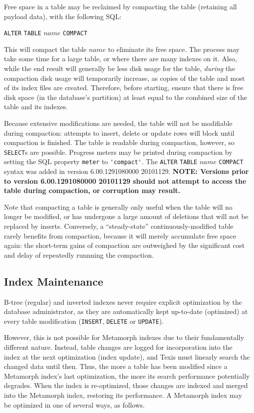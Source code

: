   Free space in a table may be reclaimed by compacting the table
(retaining all payload data), with the following SQL:

\verb`ALTER` \verb`TABLE` $name$ \verb`COMPACT`

This will compact the table $name$ to eliminate its free space.  The
process may take some time for a large table, or where there are many
indexes on it.  Also, while the end result will generally be less disk
usage for the table, {\em during} the compaction disk usage will
temporarily increase, as copies of the table and most of its index
files are created.  Therefore, before starting, ensure that there is
free disk space (in the database's partition) at least equal to the
combined size of the table and its indexes.

Because extensive modifications are needed, the table will not be
modifiable during compaction: attempts to insert, delete or update
rows will block until compaction is finished.  The table is readable
during compaction, however, so \verb`SELECT`s are possible.  Progress
meters may be printed during compaction by setting the SQL property
\verb`meter` to \verb`'compact'`.  The \verb`ALTER` \verb`TABLE`
$name$ \verb`COMPACT` syntax was added in version 6.00.1291080000
20101129.  {\bf NOTE: Versions prior to version 6.00.1291080000
  20101129 should not attempt to access the table during compaction,
  or corruption may result.}

  Note that compacting a table is generally only useful when the table
will no longer be modified, or has undergone a large amount of
deletions that will not be replaced by inserts.  Conversely, a
``steady-state'' continuously-modified table rarely benefits from
compaction, because it will merely accumulate free space again: the
short-term gains of compaction are outweighed by the significant cost
and delay of repeatedly runnning the compaction.

\subsection{Index Maintenance}

  B-tree (regular) and inverted indexes never require explicit
optimization by the database administrator, as they are automatically
kept up-to-date (optimized) at every table modification
(\verb`INSERT`, \verb`DELETE` or \verb`UPDATE`).

  However, this is not possible for Metamorph indexes due to their
fundamentally different nature.  Instead, table changes are logged for
incorporation into the index at the next optimization (index update),
and Texis must linearly search the changed data until then.  Thus, the
more a table has been modified since a Metamorph index's last
optimization, the more its search performance potentially degrades.
When the index is re-optimized, those changes are indexed and merged
into the Metamorph index, restoring its performance.  A Metamorph
index may be optimized in one of several ways, as follows.

